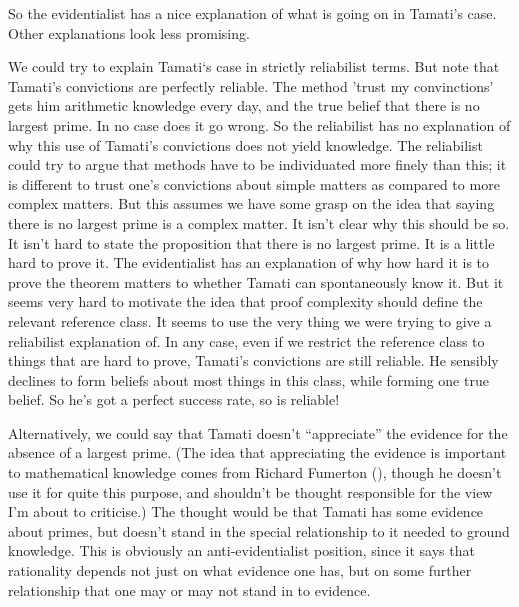 \documentclass[
  10pt,
  letterpaper,
  twoside]{scrbook}
\begin{document}
So the evidentialist has a nice explanation of what is going on in
{Tamati}'s case. Other explanations look less promising.

We could try to explain {Tamati}`s case in strictly reliabilist terms.
But note that {Tamati}'s convictions are perfectly reliable. The method
'trust my convinctions' gets him arithmetic knowledge every day, and the
true belief that there is no largest prime. In no case does it go wrong.
So the reliabilist has no explanation of why this use of {Tamati}'s
convictions does not yield knowledge. The reliabilist could try to argue
that methods have to be individuated more finely than this; it is
different to trust one's convictions about simple matters as compared to
more complex matters. But this assumes we have some grasp on the idea
that saying there is no largest prime is a complex matter. It isn't
clear why this should be so. It isn't hard to state the proposition that
there is no largest prime. It is a little hard to prove it. The
evidentialist has an explanation of why how hard it is to prove the
theorem matters to whether {Tamati} can spontaneously know it. But it
seems very hard to motivate the idea that proof complexity should define
the relevant reference class. It seems to use the very thing we were
trying to give a reliabilist explanation of. In any case, even if we
restrict the reference class to things that are hard to prove,
{Tamati}'s convictions are still reliable. He sensibly declines to form
beliefs about most things in this class, while forming one true belief.
So he's got a perfect success rate, so is reliable!

Alternatively, we could say that {Tamati} doesn't ``appreciate'' the
evidence for the absence of a largest prime. (The idea that appreciating
the evidence is important to mathematical knowledge comes from Richard
Fumerton (), though he doesn't use it
for quite this purpose, and shouldn't be thought responsible for the
view I'm about to criticise.) The thought would be that {Tamati} has
some evidence about primes, but doesn't stand in the special
relationship to it needed to ground knowledge. This is obviously an
anti-evidentialist position, since it says that rationality depends not
just on what evidence one has, but on some further relationship that one
may or may not stand in to evidence.
\end{document}
